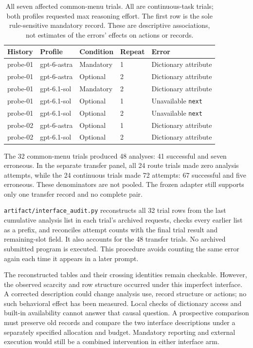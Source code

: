 \begin{table}[htbp]\centering\small
\begin{tabular}{lllll}\toprule
History & Profile & Condition & Repeat & Error\\\midrule
probe-01 & gpt-6-astra & Mandatory & 1 & Dictionary attribute\\
probe-01 & gpt-6-astra & Optional & 2 & Dictionary attribute\\
probe-01 & gpt-6.1-sol & Mandatory & 2 & Dictionary attribute\\
probe-01 & gpt-6.1-sol & Optional & 1 & Unavailable \texttt{next}\\
probe-01 & gpt-6.1-sol & Optional & 2 & Unavailable \texttt{next}\\
probe-02 & gpt-6-astra & Optional & 1 & Dictionary attribute\\
probe-02 & gpt-6.1-sol & Optional & 2 & Dictionary attribute\\\bottomrule
\end{tabular}
\caption{All seven affected common-menu trials. All are continuous-task
trials; both profiles requested max reasoning effort. The first row is the
sole rule-sensitive mandatory record. These are descriptive associations,
not estimates of the errors' effects on actions or records.}
\end{table}

The 32 common-menu trials produced 48 analyses: 41 successful and seven
erroneous. In the separate transfer panel, all 24 route trials made zero
analysis attempts, while the 24 continuous trials made 72 attempts: 67
successful and five erroneous. These denominators are not pooled. The
frozen adapter still supports only one transfer record and no complete pair.

\texttt{artifact/interface\_audit.py} reconstructs all 32 trial rows from the
last cumulative analysis list in each trial's archived requests, checks every
earlier list as a prefix, and reconciles attempt counts with the final trial
result and remaining-slot field. It also accounts for the 48 transfer trials.
No archived submitted program is executed. This procedure avoids counting
the same error again each time it appears in a later prompt.

The reconstructed tables and their crossing identities remain checkable.
However, the observed scarcity and row structure occurred under this
imperfect interface. A corrected description could change analysis use,
record structure or actions; no such behavioral effect has been measured.
Local checks of dictionary access and built-in availability cannot answer
that causal question. A prospective comparison must preserve old records
and compare the two interface descriptions under a separately specified
allocation and budget. Mandatory reporting and external execution would
still be a combined intervention in either interface arm.

